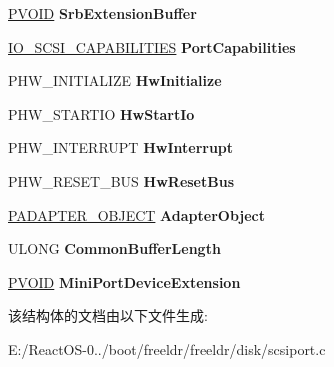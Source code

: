 \begin{DoxyCompactItemize}
\hyperlink{interfacevoid}{P\+V\+O\+ID} {\bfseries Srb\+Extension\+Buffer}
\item 
\mbox{\label{struct_s_c_s_i___p_o_r_t___d_e_v_i_c_e___e_x_t_e_n_s_i_o_n_ab7be534a9dd155fd59ac6c8911840caf}} 
\hyperlink{struct___i_o___s_c_s_i___c_a_p_a_b_i_l_i_t_i_e_s}{I\+O\+\_\+\+S\+C\+S\+I\+\_\+\+C\+A\+P\+A\+B\+I\+L\+I\+T\+I\+ES} {\bfseries Port\+Capabilities}
\item 
\mbox{\label{struct_s_c_s_i___p_o_r_t___d_e_v_i_c_e___e_x_t_e_n_s_i_o_n_a4ff6a6e1f5813c59426b8caf45212734}} 
P\+H\+W\+\_\+\+I\+N\+I\+T\+I\+A\+L\+I\+ZE {\bfseries Hw\+Initialize}
\item 
\mbox{\label{struct_s_c_s_i___p_o_r_t___d_e_v_i_c_e___e_x_t_e_n_s_i_o_n_aa3eb87187c8c315e4af807daa24fb730}} 
P\+H\+W\+\_\+\+S\+T\+A\+R\+T\+IO {\bfseries Hw\+Start\+Io}
\item 
\mbox{\label{struct_s_c_s_i___p_o_r_t___d_e_v_i_c_e___e_x_t_e_n_s_i_o_n_aa31690aa152163fbcf438f82faec7711}} 
P\+H\+W\+\_\+\+I\+N\+T\+E\+R\+R\+U\+PT {\bfseries Hw\+Interrupt}
\item 
\mbox{\label{struct_s_c_s_i___p_o_r_t___d_e_v_i_c_e___e_x_t_e_n_s_i_o_n_a6af64c3280623d274b266f1f5e6c0cef}} 
P\+H\+W\+\_\+\+R\+E\+S\+E\+T\+\_\+\+B\+US {\bfseries Hw\+Reset\+Bus}
\item 
\mbox{\label{struct_s_c_s_i___p_o_r_t___d_e_v_i_c_e___e_x_t_e_n_s_i_o_n_a58989336930ae1ef9d5968f2447c4396}} 
\hyperlink{struct___d_m_a___a_d_a_p_t_e_r}{P\+A\+D\+A\+P\+T\+E\+R\+\_\+\+O\+B\+J\+E\+CT} {\bfseries Adapter\+Object}
\item 
\mbox{\label{struct_s_c_s_i___p_o_r_t___d_e_v_i_c_e___e_x_t_e_n_s_i_o_n_ad76b6fbc8515a34a4d5209940b368163}} 
U\+L\+O\+NG {\bfseries Common\+Buffer\+Length}
\item 
\mbox{\label{struct_s_c_s_i___p_o_r_t___d_e_v_i_c_e___e_x_t_e_n_s_i_o_n_a021718c141af5e7f9ddf09c5fb259544}} 
\hyperlink{interfacevoid}{P\+V\+O\+ID} {\bfseries Mini\+Port\+Device\+Extension}
\end{DoxyCompactItemize}


该结构体的文档由以下文件生成\+:\begin{DoxyCompactItemize}
\item 
E\+:/\+React\+O\+S-\/0../boot/freeldr/freeldr/disk/scsiport.\+c\end{DoxyCompactItemize}
